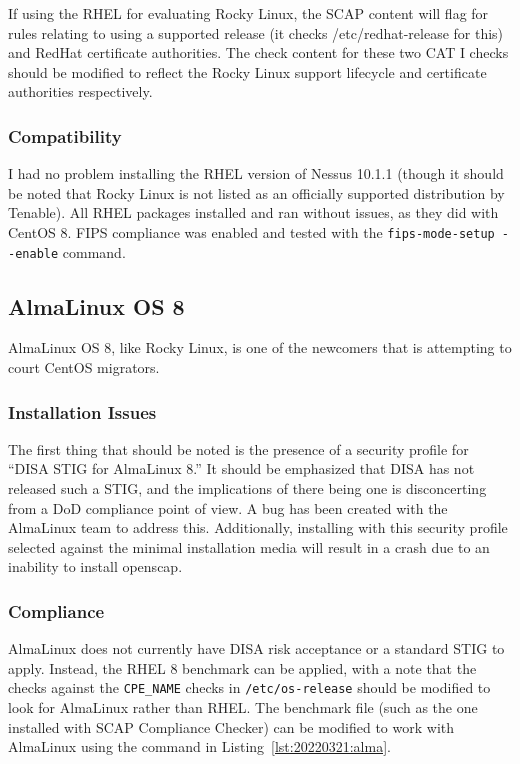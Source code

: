 If using the RHEL for evaluating Rocky Linux, the SCAP content will flag for rules relating to using a supported release (it checks /etc/redhat-release for this) and RedHat certificate authorities. The check content for these two CAT I checks should be modified to reflect the Rocky Linux support lifecycle and certificate authorities respectively.

\subsubsection{Compatibility}
I had no problem installing the RHEL version of Nessus 10.1.1 (though it should be noted that Rocky Linux is not listed as an officially supported distribution by Tenable). All RHEL packages installed and ran without issues, as they did with CentOS 8. FIPS compliance was enabled and tested with the \texttt{fips-mode-setup -\phantom{}-enable} command.

\subsection{AlmaLinux OS 8}
AlmaLinux OS 8, like Rocky Linux, is one of the newcomers that is attempting to court CentOS migrators.

\subsubsection{Installation Issues}
The first thing that should be noted is the presence of a security profile for ``DISA STIG for AlmaLinux 8.'' It should be emphasized that DISA has not released such a STIG, and the implications of there being one is disconcerting from a DoD compliance point of view. A bug has been created with the AlmaLinux team to address this.\autocite{20220321:almabug} Additionally, installing with this security profile selected against the minimal installation media will result in a crash due to an inability to install openscap.

\subsubsection{Compliance}
AlmaLinux does not currently have DISA risk acceptance or a standard STIG to apply. Instead, the RHEL 8 benchmark can be applied, with a note that the checks against the \texttt{CPE\_NAME} checks in \texttt{/etc/os-release} should be modified to look for AlmaLinux rather than RHEL. The benchmark file (such as the one installed with SCAP Compliance Checker) can be modified to work with AlmaLinux using the command in Listing~\ref{lst:20220321:alma}.

